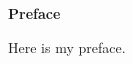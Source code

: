 
\newpage
\vspace*{0.9cm}
\begin{center}
{\bf \Huge Preface}
\end{center}

\setlength{\baselineskip}{0.8cm}



Here is my preface.
